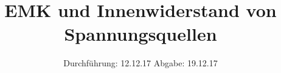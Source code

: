

\subject{V301}
\title{EMK und Innenwiderstand von Spannungsquellen}
\date{
  Durchführung: 12.12.17
  \hspace{3em}
  Abgabe: 19.12.17
}



\maketitle
\thispagestyle{empty}
\tableofcontents
\newpage








\newpage
\printbibliography


